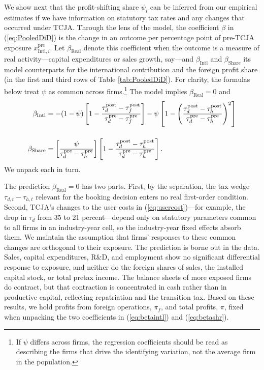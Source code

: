 \documentclass[11pt,letterpaper]{article}
\begin{document}
We show next that the profit-shifting share $\psi_i$ can be inferred from 
our empirical estimates if we have information on statutory tax rates and any
changes that occurred under TCJA.
Through the lens of the model, the coefficient $\beta$ in
(\ref{eq:PooledDiD}) is the change in an outcome per percentage point
of pre-TCJA exposure $x^{\text{pre}}_{\text{Intl},i}$. Let
$\beta_{\text{Real}}$ denote this coefficient when the outcome is a
measure of real activity---capital expenditures or sales growth,
say---and $\beta_{\text{Intl}}$ and $\beta_{\text{Share}}$ its model
counterparts for the international contribution and the foreign profit
share (in the first and third rows of Table \ref{tab:PooledDiD}). 
For clarity, the formulas below treat $\psi$ as common across firms.\footnote{%
If $\psi$ differs across firms, the regression coefficients should be read as
describing the firms that drive the identifying variation, not the average firm
in the population.}
The model implies $\beta_{\text{Real}}=0$ and
\begin{align}
  \beta_{\text{Intl}} & = -(1-\psi) \left[1-\frac{\tau_d^{\text{post}}-\tau_f^{\text{post}}}
                                                     {\tau_d^{\text{pre}}-\tau_f^{\text{pre}}}\right]
                              -\psi \left[1-\left(\frac{\tau_d^{\text{post}}-\tau_h^{\text{post}}}
                                                        {\tau_d^{\text{pre}}-\tau_h^{\text{pre}}}\right)^2\right]
 \label{eq:betaintl}\\
 \noalign{\bigskip}
  \beta_{\text{Share}} & = \left[\frac{\psi}{\tau_d^{\text{pre}}-\tau_h^{\text{pre}}}\right]
                                 \left[1-\frac{\tau_d^{\text{post}}-\tau_h^{\text{post}}}
                                            {\tau_d^{\text{pre}}-\tau_h^{\text{pre}}}\right].
 \label{eq:betashr}
\end{align}
We unpack each in turn.

The prediction $\beta_{\text{Real}}=0$ has two parts. First, by the separation,
the tax wedge $\tau_{d,t}-\tau_{h,t}$ relevant for the booking decision
enters no real first-order
condition. Second, TCJA's changes to the user costs in
(\ref{eq:usercost})---for example, the drop in $\tau_d$ from 35 to 21
percent---depend only on statutory parameters common to all firms in
an industry-year cell, so the industry-year fixed effects absorb them.
We maintain the assumption that firms' responses to these common
changes are orthogonal to their exposure. The prediction is borne out
in the data. Sales, capital expenditures, R\&D, and employment show no
significant differential response to exposure, and neither do the
foreign shares of sales, the installed capital stock, or total pretax income.
The balance sheets of more exposed firms do
contract, but that contraction is concentrated in cash rather than in
productive capital, reflecting repatriation and the transition tax.
Based on these results, we hold profits 
from foreign operations, $\pi_f$, and total profits, $\pi$, fixed when unpacking
the two coefficients in (\ref{eq:betaintl}) and (\ref{eq:betashr}).
\end{document}
